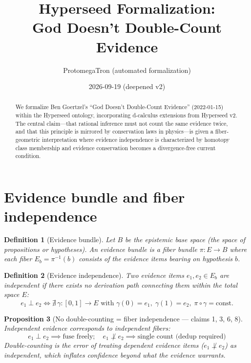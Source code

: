 \documentclass[11pt,a4paper]{article}
\title{Hyperseed Formalization:\\
  God Doesn't Double-Count Evidence}
\author{ProtomegaTron (automated formalization)}
\date{2026-09-19 (deepened v2)}
\newtheorem{definition}{Definition}[section]
\newtheorem{proposition}[definition]{Proposition}
\begin{document}
\maketitle

\begin{abstract}
We formalize Ben Goertzel's ``God Doesn't Double-Count Evidence'' (2022-01-15)
within the Hyperseed ontology, incorporating d-calculus extensions from
Hyperseed v2. The central claim---that rational inference must not count
the same evidence twice, and that this principle is mirrored by conservation
laws in physics---is given a fiber-geometric interpretation where evidence
independence is characterized by homotopy class membership and evidence
conservation becomes a divergence-free current condition.
\end{abstract}

\tableofcontents

\section{Evidence bundle and fiber independence}

\begin{definition}[Evidence bundle]
Let $B$ be the epistemic base space (the space of propositions or hypotheses).
An \emph{evidence bundle} is a fiber bundle $\pi : E \to B$ where each fiber
$E_b = \pi^{-1}(b)$ consists of the evidence items bearing on hypothesis $b$.
\end{definition}

\begin{definition}[Evidence independence]
Two evidence items $e_1, e_2 \in E_b$ are \emph{independent} if there exists
no derivation path connecting them within the total space $E$:
\[
  e_1 \perp e_2 \iff \nexists\, \gamma : [0,1] \to E \text{ with }
  \gamma(0) = e_1,\; \gamma(1) = e_2,\;
  \pi \circ \gamma = \text{const.}
\]
\end{definition}

\begin{proposition}[No double-counting = fiber independence --- claims 1, 3, 6, 8]
\label{prop:nodc}
Independent evidence corresponds to independent fibers:
\[
  e_1 \perp e_2 \implies \text{fuse freely}; \quad
  e_1 \not\perp e_2 \implies \text{single count (dedup required)}
\]
Double-counting is the error of treating dependent evidence items
($e_1 \not\perp e_2$) as independent, which inflates confidence
beyond what the evidence warrants.
\end{proposition}
\end{document}
